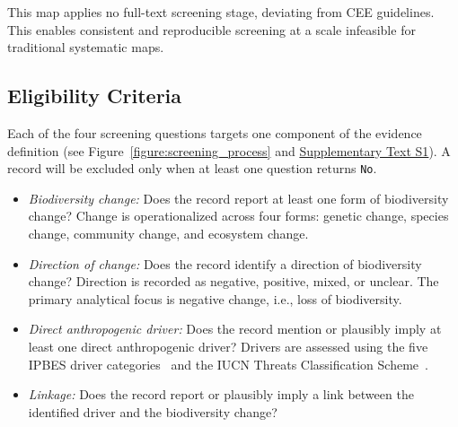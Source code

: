 \documentclass[12pt]{article}
\newcommand\ie{i.e.,\xspace}
\begin{document}
This map applies no full-text screening stage, deviating from CEE guidelines. This enables consistent and reproducible screening at a scale infeasible for traditional systematic maps.

\subsection*{Eligibility Criteria}
Each of the four screening questions targets one component of the evidence 
definition (see Figure~\ref{figure:screening_process} and \hyperref[sec:biodiversity_loss_evidence]{Supplementary Text S1}). A record will be excluded only when at least one question returns \texttt{No}.

\begin{itemize}
\item \emph{Biodiversity change:} Does the record report at least one form of 
biodiversity change? Change is operationalized across four forms: genetic 
change, species change, community change, and ecosystem change.

\item \emph{Direction of change:} Does the record identify a direction of biodiversity change? Direction is recorded as negative, positive, mixed, or unclear. The primary analytical focus is negative change, \ie loss of biodiversity.

\item \emph{Direct anthropogenic driver:} Does the record mention or plausibly imply at least one direct anthropogenic driver? Drivers are assessed using the five IPBES driver categories~\cite{diaz_ipbes_2015} and the IUCN Threats Classification Scheme~\cite{iucn_threats_classification_2022}. 

\item \emph{Linkage:} Does the record report or plausibly imply a link between the identified driver and the biodiversity change?
\end{itemize}
\end{document}
